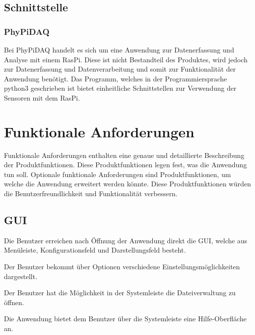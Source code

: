\documentclass[parskip=full]{scrartcl}
\begin{document}
\subsection{Schnittstelle}

\subsubsection{PhyPiDAQ}

Bei PhyPiDAQ handelt es sich um eine Anwendung zur Datenerfassung und Analyse mit einem \gls{RasPi}. Diese ist nicht Bestandteil des Produktes, wird jedoch zur Datenerfassung und Datenverarbeitung und somit zur Funktionalität der Anwendung  benötigt. Das Programm, welches in der Programmiersprache \gls{python3} geschrieben ist bietet einheitliche Schnittstellen zur Verwendung der Sensoren mit dem \gls{RasPi}.

\clearpage
\section{Funktionale Anforderungen}\label{funktionale}

Funktionale Anforderungen enthalten eine genaue und detaillierte Beschreibung der Produktfunktionen. Diese Produktfunktionen legen fest, was die Anwendung tun soll. Optionale funktionale Anforderungen sind Produktfunktionen, um welche die Anwendung erweitert werden könnte. Diese Produktfunktionen würden die Benutzerfreundlichkeit und Funktionalität verbessern.


\subsection{GUI} %

\begin{description}
\hypertarget{link-f010}{\item[F010]} Die Benutzer erreichen nach Öffnung der Anwendung direkt die \gls{GUI}, welche aus Menüleiste, Konfigurationsfeld und Darstellungsfeld besteht.
\hypertarget{link-f020}{\item[F020]} Der Benutzer bekommt über Optionen verschiedene Einstellungsmöglichkeiten dargestellt. 
\hypertarget{link-f030}{\item[F030]} Der Benutzer hat die Möglichkeit in der Systemleiste die Dateiverwaltung zu öffnen.
\hypertarget{link-f040}{\item[F040]} Die Anwendung bietet dem Benutzer über die Systemleiste eine Hilfe-Oberfläche an.
\end{description}
\end{document}
